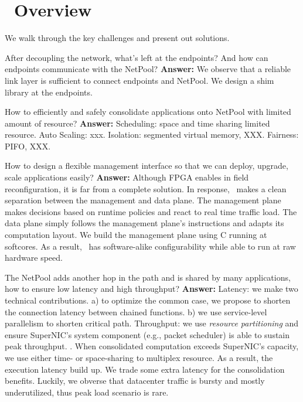 

\section{\sysname\ Overview}
\label{sec:overview}

We walk through the key challenges and present out solutions.

\begin{itemize}[leftmargin=0cm,itemindent=.35cm]

After decoupling the network, what's left at the endpoints?
And how can endpoints communicate with the NetPool?
%
\textbf{Answer:} \TODO{}
We observe that a reliable link layer is sufficient
to connect endpoints and NetPool.
We design a shim library at the endpoints.

How to efficiently and safely consolidate applications onto NetPool
with limited amount of resource?
%
\textbf{Answer:} \TODO{}
Scheduling: space and time sharing limited resource.
Auto Scaling: xxx.
Isolation: segmented virtual memory, XXX.
Fairness: PIFO, XXX.



How to design a flexible management interface so that
we can deploy, upgrade, scale applications easily?
\textbf{Answer:}
Although FPGA enables in field reconfiguration,
it is far from a complete solution.
In response, \sysname\ makes a clean separation between the management and data plane.
The management plane makes decisions based on runtime policies
and react to real time traffic load. The data plane simply follows
the management plane's instructions and adapts its computation layout.
We build the management plane using C running at softcores.
As a result, \sysname\ has software-alike configurability
while able to run at raw hardware speed.

 The NetPool adds another hop in the path and is
shared by many applications, how to ensure low latency and high throughput?
%
\textbf{Answer:}
Latency: we make two technical contributions.
a) to optimize the common case, we propose 
to shorten the connection latency between chained functions.
b) we use service-level parallelism to shorten critical path.
Throughput:
we use \textit{resource partitioning} and ensure SuperNIC's system
component (e.g., packet scheduler) is able to sustain peak throughput.
.
When consolidated computation exceeds SuperNIC's capacity,
we use either time- or space-sharing to multiplex resource.
As a result, the execution latency build up.
We trade some extra latency for the consolidation benefits.
Luckily, we obverse that datacenter traffic is bursty and mostly underutilized,
thus peak load scenario is rare.


\end{itemize}
